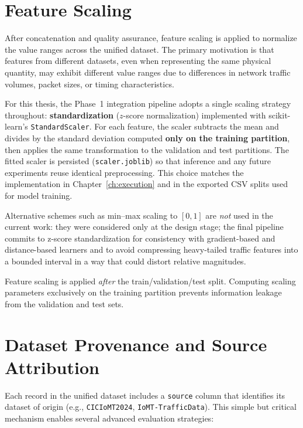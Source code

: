 \section{Feature Scaling}
\label{sec:scaling}

After concatenation and quality assurance, feature scaling is applied to normalize the value ranges across the unified dataset. The primary motivation is that features from different datasets, even when representing the same physical quantity, may exhibit different value ranges due to differences in network traffic volumes, packet sizes, or timing characteristics.

For this thesis, the Phase~1 integration pipeline adopts a single scaling strategy throughout: \textbf{standardization} ($z$-score normalization) implemented with scikit-learn's \texttt{StandardScaler}. For each feature, the scaler subtracts the mean and divides by the standard deviation computed \textbf{only on the training partition}, then applies the same transformation to the validation and test partitions. The fitted scaler is persisted (\texttt{scaler.joblib}) so that inference and any future experiments reuse identical preprocessing. This choice matches the implementation in Chapter~\ref{ch:execution} and in the exported CSV splits used for model training.

Alternative schemes such as min--max scaling to $[0,1]$ are \textit{not} used in the current work: they were considered only at the design stage; the final pipeline commits to z-score standardization for consistency with gradient-based and distance-based learners and to avoid compressing heavy-tailed traffic features into a bounded interval in a way that could distort relative magnitudes.

Feature scaling is applied \textit{after} the train/validation/test split. Computing scaling parameters exclusively on the training partition prevents information leakage from the validation and test sets.

\section{Dataset Provenance and Source Attribution}
\label{sec:provenance}

Each record in the unified dataset includes a \texttt{source} column that identifies its dataset of origin (e.g., \texttt{CICIoMT2024}, \texttt{IoMT-TrafficData}). This simple but critical mechanism enables several advanced evaluation strategies:

